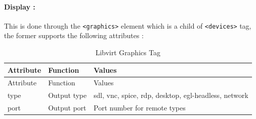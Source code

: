 \documentclass[
  14pt,
  english,
  a4paper,
]{scrreprt}
\begin{document}
\hypertarget{display}{%
\paragraph*{Display :}\label{display}}

This is done through the \texttt{\textless{}graphics\textgreater{}}
element which is a child of \texttt{\textless{}devices\textgreater{}}
tag, the former supports the following attributes :

\hypertarget{tbl:lvirt_disp_tag}{}
\begin{longtable}[]{@{}lll@{}}
\caption{\label{tbl:lvirt_disp_tag}Libvirt Graphics Tag}\tabularnewline
\toprule
\begin{minipage}[b]{0.14\columnwidth}\raggedright
Attribute\strut
\end{minipage} & \begin{minipage}[b]{0.16\columnwidth}\raggedright
Function\strut
\end{minipage} & \begin{minipage}[b]{0.62\columnwidth}\raggedright
Values\strut
\end{minipage}\tabularnewline
\midrule
\endfirsthead
\toprule
\begin{minipage}[b]{0.14\columnwidth}\raggedright
Attribute\strut
\end{minipage} & \begin{minipage}[b]{0.16\columnwidth}\raggedright
Function\strut
\end{minipage} & \begin{minipage}[b]{0.62\columnwidth}\raggedright
Values\strut
\end{minipage}\tabularnewline
\midrule
\endhead
\begin{minipage}[t]{0.14\columnwidth}\raggedright
type\strut
\end{minipage} & \begin{minipage}[t]{0.16\columnwidth}\raggedright
Output type\strut
\end{minipage} & \begin{minipage}[t]{0.62\columnwidth}\raggedright
sdl, vnc, spice, rdp, desktop, egl-headless, network\strut
\end{minipage}\tabularnewline
\begin{minipage}[t]{0.14\columnwidth}\raggedright
port\strut
\end{minipage} & \begin{minipage}[t]{0.16\columnwidth}\raggedright
Output port\strut
\end{minipage} & \begin{minipage}[t]{0.62\columnwidth}\raggedright
Port number for remote types\strut
\end{minipage}\tabularnewline
\bottomrule
\end{longtable}
\end{document}
